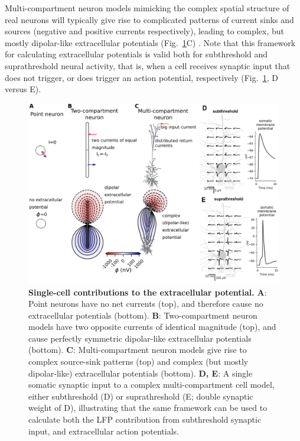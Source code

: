 \documentclass[preprint,11pt,authoryear]{elsarticle}
\newcommand{\tvntxt}[1]{{\color{OliveGreen}#1}}
\begin{document}
Multi-compartment neuron models mimicking the complex spatial structure of real neurons will typically give rise to complicated patterns of current sinks and sources (negative and positive currents respectively), leading to complex, but mostly dipolar-like extracellular potentials (Fig.~\ref{fig:EP_morph}C) \citep{Einevoll2013}.
Note that this framework for calculating extracellular potentials is valid both for subthreshold and suprathreshold neural activity, that is, when a cell receives synaptic input that does not trigger, or does trigger an action potential, respectively (Fig.~\ref{fig:EP_morph}, D versus E).

\begin{figure}[!ht]
\begin{center}
\includegraphics[width=1\textwidth]{single_cell_EP}
\end{center}
\caption{\textbf{Single-cell contributions to the extracellular potential.} 
{\bf A}: Point neurons have no net currents (top), and therefore cause no extracellular potentials (bottom). 
{\bf B}: Two-compartment neuron models have two opposite currents
of identical magnitude (top), and cause perfectly \tvntxt{symmetric dipolar-like}  extracellular potentials (bottom). 
{\bf C}: Multi-compartment neuron models \citep{Hay2011} give rise to complex source-sink patterns (top) and complex (but mostly dipolar-like) extracellular potentials (bottom). 
{\bf D, E}: A single somatic synaptic input to a complex multi-compartment cell model, either subthreshold (D) or suprathreshold (E; double synaptic weight of D), illustrating that the same framework can be used to calculate both the LFP contribution from subthreshold synaptic input, and extracellular action potentials. 
}
\label{fig:EP_morph}
\end{figure}
\end{document}
